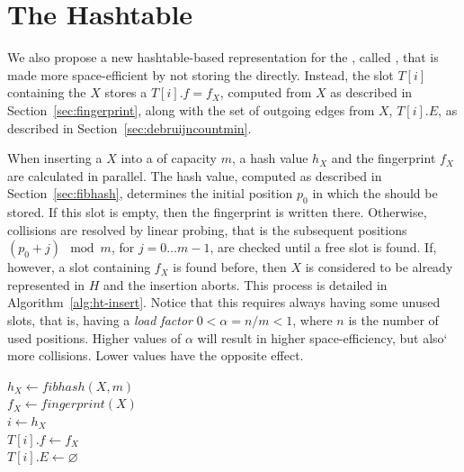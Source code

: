 \section{The \dB Hashtable}
\label{sec:debruijnhashtable}

We also propose a new hashtable-based representation for the \dBG, called  \dBHT, that is made more space-efficient by not storing the \kmer directly. Instead, the slot $T[i]$ containing the \kmer $X$ stores a  $T[i].f = f_X$, computed from $X$ as described in Section~\ref{sec:fingerprint}, along with the set of outgoing edges from $X$, $T[i].E$,  as described in Section~\ref{sec:debruijncountmin}.

When inserting a \kmer $X$ into a \dBHT of capacity $m$, a hash value $h_X$ and the fingerprint $f_X$ are calculated in parallel. The hash value, computed as described in Section~\ref{sec:fibhash}, determines the initial position $p_0$ in which the \kmer should be stored. If this slot is empty, then the fingerprint is written there. Otherwise, collisions are resolved by linear probing, that is the subsequent positions $(p_0+j)\mod m$, for $j=0\ldots m-1$, are checked until a free slot is found. If, however, a slot containing $f_X$ is found before, then $X$ is considered to be already represented in $H$ and the insertion aborts. This process is detailed in Algorithm~\ref{alg:ht-insert}. 
Notice that this requires always having some unused slots, that is, having a \emph{load factor} $0 < \alpha=n/m < 1$, where $n$ is the number of used positions. Higher values of $\alpha$ will result in higher space-efficiency, but also` more collisions. Lower values have the opposite effect. 


\begin{algorithm}
	\caption{$T.\mathit{insert}(X$)}\label{alg:ht-insert}
	$h_X \gets \mathit{fibhash}(X, m)$\\
	$f_X \gets \mathit{fingerprint}(X)$\\
	$i \gets h_X$\\
	$T[i].f\gets f_X$\\
	$T[i].E\gets \varnothing$\\
\end{algorithm}

